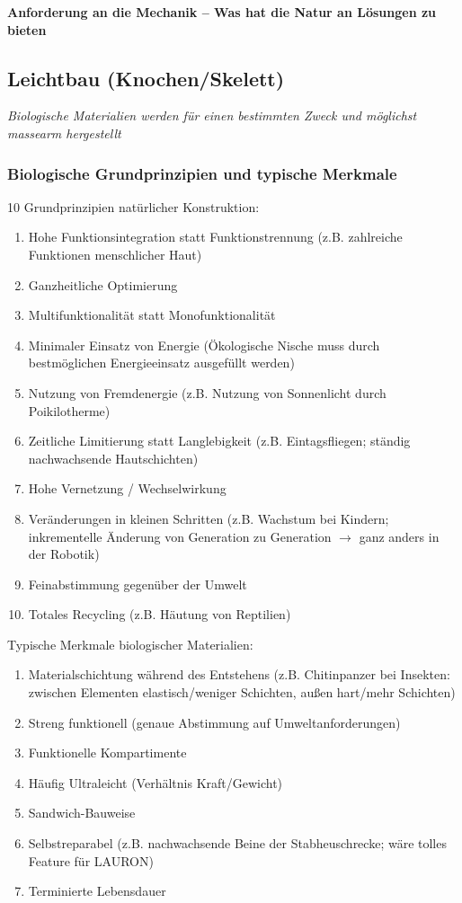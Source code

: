 \textbf{Anforderung an die Mechanik -- Was hat die Natur an Lösungen zu bieten}

\subsection{Leichtbau (Knochen/Skelett)}
\emph{Biologische Materialien werden für einen bestimmten Zweck und möglichst massearm hergestellt}

\subsubsection{Biologische Grundprinzipien und typische Merkmale}
10 Grundprinzipien natürlicher Konstruktion:
\begin{enumerate}
	\item Hohe Funktionsintegration statt Funktionstrennung (z.B. zahlreiche Funktionen menschlicher Haut)
	\item Ganzheitliche Optimierung
	\item Multifunktionalität statt Monofunktionalität 
	\item Minimaler Einsatz von Energie (Ökologische Nische muss durch bestmöglichen Energieeinsatz ausgefüllt werden)
	\item Nutzung von Fremdenergie (z.B. Nutzung von Sonnenlicht durch Poikilotherme)
	\item Zeitliche Limitierung statt Langlebigkeit (z.B. Eintagsfliegen; ständig nachwachsende Hautschichten)
	\item Hohe Vernetzung / Wechselwirkung
	\item Veränderungen in kleinen Schritten (z.B. Wachstum bei Kindern; inkrementelle Änderung von Generation zu Generation $\rightarrow$ ganz anders in der Robotik)
	\item Feinabstimmung gegenüber der Umwelt
	\item Totales Recycling (z.B. Häutung von Reptilien)
\end{enumerate}
Typische Merkmale biologischer Materialien:
\begin{enumerate}
	\item Materialschichtung während des Entstehens (z.B. Chitinpanzer bei Insekten: zwischen Elementen elastisch/weniger Schichten, außen hart/mehr Schichten)
	\item Streng funktionell (genaue Abstimmung auf Umweltanforderungen)
	\item Funktionelle Kompartimente
	\item Häufig Ultraleicht (Verhältnis Kraft/Gewicht)
	\item Sandwich-Bauweise
	\item Selbstreparabel (z.B. nachwachsende Beine der Stabheuschrecke; wäre tolles Feature für LAURON)
	\item Terminierte Lebensdauer
\end{enumerate}

